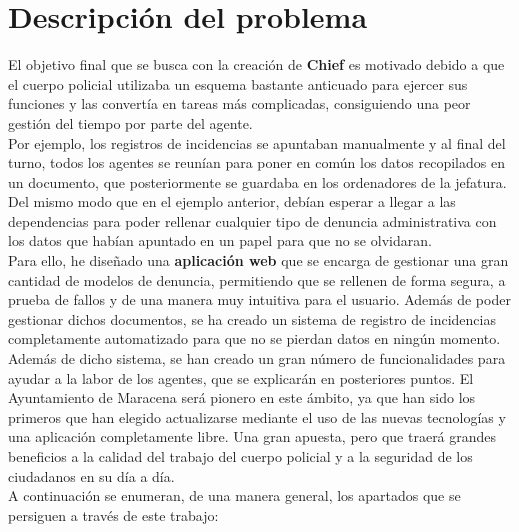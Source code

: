 \chapter{Descripción del problema}

El objetivo final que se busca con la creación de \textbf{Chief} es motivado debido a que el cuerpo policial utilizaba un esquema 
bastante anticuado para ejercer sus funciones y las convertía en tareas más complicadas, consiguiendo
una peor gestión del tiempo por parte del agente.\\

Por ejemplo, los registros de incidencias se apuntaban manualmente y al final del turno, todos los agentes se reunían para poner 
en común los datos recopilados en un documento, que posteriormente se guardaba en los ordenadores de la jefatura. Del mismo modo que en el ejemplo anterior, debían 
esperar a llegar a las dependencias para poder rellenar cualquier tipo de denuncia administrativa con los datos que habían
apuntado en un papel para que no se olvidaran.\\

Para ello, he diseñado una \textbf{aplicación web} que se encarga de gestionar una gran cantidad de 
modelos de denuncia, permitiendo que se rellenen de forma segura, a prueba de 
fallos y de una manera muy intuitiva para el usuario. Además de poder gestionar dichos documentos,
se ha creado un sistema de registro de incidencias completamente automatizado para que no se pierdan datos en ningún momento. Además de dicho sistema, se han creado un gran número de funcionalidades para ayudar a la labor de los agentes, que se explicarán en 
posteriores puntos. El Ayuntamiento de Maracena será pionero en este ámbito, ya que han sido los 
primeros que han elegido actualizarse mediante el uso de las nuevas tecnologías y una aplicación completamente libre. Una gran apuesta, pero que traerá grandes
beneficios a la calidad del trabajo del cuerpo policial y a la seguridad de los ciudadanos en su día a día. \\

A continuación se enumeran, de una manera general, los apartados que se persiguen a través de este trabajo:

